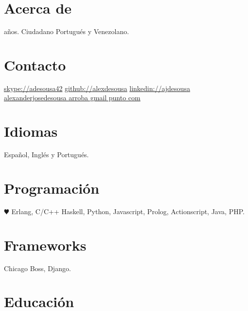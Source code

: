 \documentclass[]{friggeri-cv} %
\newcommand{\myage}[3]{%
    \newcounter{age}
    \setcounter{age}{\the\year}
    \addtocounter{age}{-#1}
    \ifthenelse{\the\month < #2}{
        \addtocounter{age}{-1}
    }{
        \ifthenelse{\the\month = #2}{
            \ifthenelse{\the\day < #3}{
                \addtocounter{age}{-1}
            }{}
        }{}
    }
    \theage
}
\begin{document}


\begin{aside} %
\section{Acerca de}
\myage{1989}{01}{12} años.
Ciudadano Portugués y Venezolano.
\section{Contacto}
\href{skype://adesousa42}{skype://adesousa42}
\href{http://github.com/alexdesousa}{github://alexdesousa}
\href{https://www.linkedin.com/in/ajdesousa}{linkedin://ajdesousa}
~
\href{mailto:alexanderjosedesousa@gmail.com}{alexanderjosedesousa arroba gmail punto
com}
\section{Idiomas}
Español, Inglés y Portugués.
\section{Programación}
{\color{red} $\varheartsuit$} Erlang, C/C++
Haskell, Python, Javascript,
Prolog, Actionscript, Java, PHP.
\section{Frameworks}
Chicago Boss, Django.
\end{aside}


\section{Educación}
\end{document}
